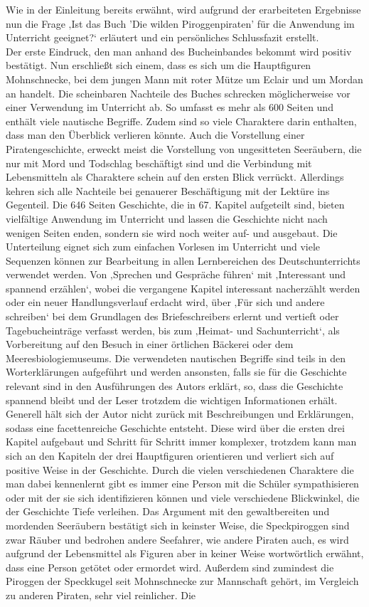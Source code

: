 Wie in der Einleitung bereits erwähnt, wird aufgrund der erarbeiteten Ergebnisse nun die Frage ‚Ist das Buch 'Die wilden Piroggenpiraten' für die Anwendung im Unterricht geeignet?‘ erläutert und ein persönliches Schlussfazit erstellt.
\\
Der erste Eindruck, den man anhand des Bucheinbandes bekommt wird positiv bestätigt. Nun erschließt sich einem, dass es sich um die Hauptfiguren Mohnschnecke, bei dem jungen Mann mit roter Mütze um Eclair und um Mordan an handelt. 
Die scheinbaren Nachteile des Buches schrecken möglicherweise vor einer Verwendung im Unterricht ab. So umfasst es mehr als 600 Seiten und enthält viele nautische Begriffe. Zudem sind so viele Charaktere darin enthalten, dass man den Überblick verlieren könnte. Auch die Vorstellung einer Piratengeschichte, erweckt meist die Vorstellung von ungesitteten Seeräubern, die nur mit Mord und Todschlag beschäftigt sind und die Verbindung mit Lebensmitteln als Charaktere schein auf den ersten Blick verrückt. Allerdings kehren sich alle Nachteile bei genauerer Beschäftigung mit der Lektüre ins Gegenteil. Die 646 Seiten Geschichte, die in 67. Kapitel aufgeteilt sind, bieten vielfältige Anwendung im Unterricht und lassen die Geschichte nicht nach wenigen Seiten enden, sondern sie wird noch weiter auf- und ausgebaut. Die Unterteilung eignet sich zum einfachen Vorlesen im Unterricht und viele Sequenzen können zur Bearbeitung in allen Lernbereichen des Deutschunterrichts verwendet werden. Von ‚Sprechen und Gespräche führen‘ mit ‚Interessant und spannend erzählen‘, wobei die vergangene Kapitel interessant nacherzählt werden oder ein neuer Handlungsverlauf erdacht wird, über ‚Für sich und andere schreiben‘ bei dem Grundlagen des Briefeschreibers erlernt und vertieft oder Tagebucheinträge verfasst werden, bis zum ‚Heimat- und Sachunterricht‘, als Vorbereitung auf den Besuch in einer örtlichen Bäckerei oder dem Meeresbiologiemuseums. Die verwendeten nautischen Begriffe sind teils in den Worterklärungen \cite[S.647]{pir} aufgeführt und werden ansonsten, falls sie für die Geschichte relevant sind in den Ausführungen des Autors erklärt, so, dass die Geschichte spannend bleibt und der Leser trotzdem die wichtigen Informationen erhält. Generell hält sich der Autor nicht zurück mit Beschreibungen und Erklärungen, sodass eine facettenreiche Geschichte entsteht. Diese wird über die ersten drei Kapitel aufgebaut und Schritt für Schritt immer komplexer, trotzdem kann man sich an den Kapiteln der drei Hauptfiguren orientieren und verliert sich auf positive Weise in der Geschichte. Durch die vielen verschiedenen Charaktere die man dabei kennenlernt gibt es immer eine Person mit die Schüler sympathisieren oder mit der sie sich identifizieren können und viele verschiedene Blickwinkel, die der Geschichte Tiefe verleihen. Das Argument mit den gewaltbereiten und mordenden Seeräubern bestätigt sich in keinster Weise, die Speckpiroggen sind zwar Räuber und bedrohen andere Seefahrer, wie andere Piraten auch, es wird aufgrund der Lebensmittel als Figuren aber in keiner Weise wortwörtlich erwähnt, dass eine Person getötet oder ermordet wird. Außerdem sind zumindest die Piroggen der Speckkugel seit Mohnschnecke zur Mannschaft gehört, im Vergleich zu anderen Piraten, sehr viel reinlicher. Die 